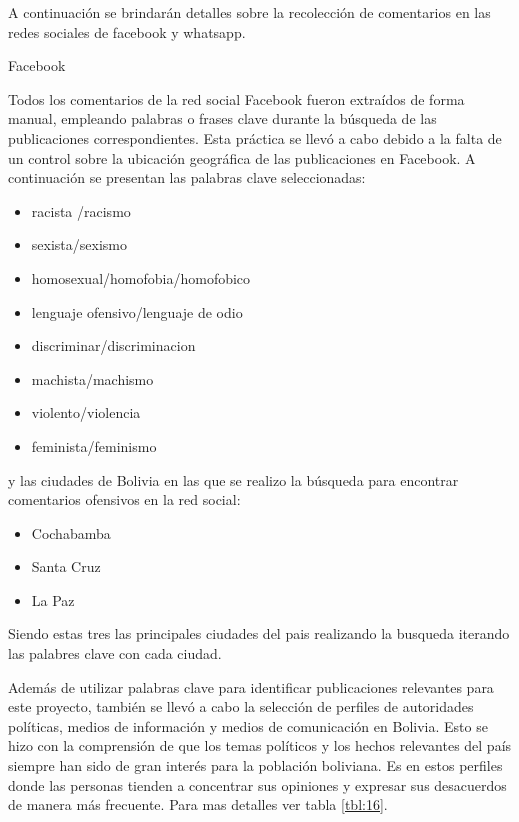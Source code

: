 A continuación se brindarán detalles sobre la recolección de comentarios en las redes sociales de facebook y whatsapp.

Facebook

Todos los comentarios de la red social Facebook fueron extraídos de forma manual, empleando palabras o frases clave durante la búsqueda de las publicaciones correspondientes. Esta práctica se llevó a cabo debido a la falta de un control sobre la ubicación geográfica de las publicaciones en Facebook. A continuación se presentan las palabras clave seleccionadas:
\begin{itemize}
	\item racista /racismo
	\item sexista/sexismo
	\item homosexual/homofobia/homofobico
	\item lenguaje ofensivo/lenguaje de odio 
	\item discriminar/discriminacion
	\item machista/machismo
	\item violento/violencia
	\item feminista/feminismo  
\end{itemize}
y las ciudades de Bolivia en las que se realizo la búsqueda para encontrar comentarios ofensivos en la red social:
\begin{itemize}
	\item Cochabamba
	\item Santa Cruz
	\item La Paz
	
\end{itemize}

Siendo estas tres las principales ciudades del pais realizando la busqueda iterando las palabres clave con cada ciudad.


Además de utilizar palabras clave para identificar publicaciones relevantes para este proyecto, también se llevó a cabo la selección de perfiles de autoridades políticas, medios de información y medios de comunicación en Bolivia. Esto se hizo con la comprensión de que los temas políticos y los hechos relevantes del país siempre han sido de gran interés para la población boliviana. Es en estos perfiles donde las personas tienden a concentrar sus opiniones y expresar sus desacuerdos de manera más frecuente. Para mas detalles ver tabla \ref{tbl:16}.


